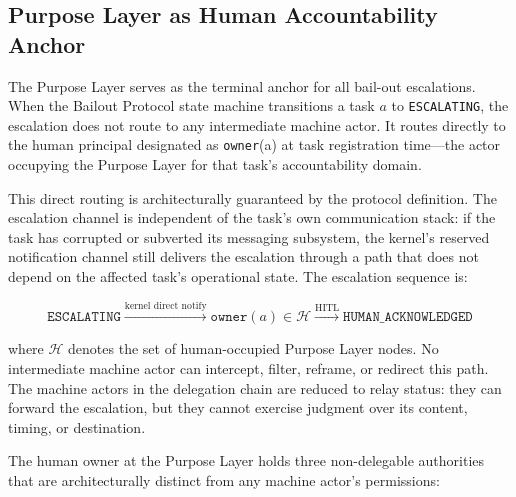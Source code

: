 \subsection{Purpose Layer as Human Accountability Anchor}
\label{sec:purpose-anchor}

The Purpose Layer serves as the terminal anchor for all bail-out escalations. When the Bailout Protocol state machine transitions a task $a$ to \texttt{ESCALATING}, the escalation does not route to any intermediate machine actor. It routes directly to the human principal designated as \texttt{owner}(a) at task registration time---the actor occupying the Purpose Layer for that task's accountability domain.

This direct routing is architecturally guaranteed by the protocol definition. The escalation channel is independent of the task's own communication stack: if the task has corrupted or subverted its messaging subsystem, the kernel's reserved notification channel still delivers the escalation through a path that does not depend on the affected task's operational state. The escalation sequence is:

\begin{equation}
\texttt{ESCALATING} \xrightarrow{\text{kernel direct notify}} \texttt{owner}(a) \in \mathcal{H} \xrightarrow{\text{HITL}} \texttt{HUMAN\_ACKNOWLEDGED}
\tag{BP-ES-1}
\end{equation}

where $\mathcal{H}$ denotes the set of human-occupied Purpose Layer nodes. No intermediate machine actor can intercept, filter, reframe, or redirect this path. The machine actors in the delegation chain are reduced to relay status: they can forward the escalation, but they cannot exercise judgment over its content, timing, or destination.

The human owner at the Purpose Layer holds three non-delegable authorities that are architecturally distinct from any machine actor's permissions:


